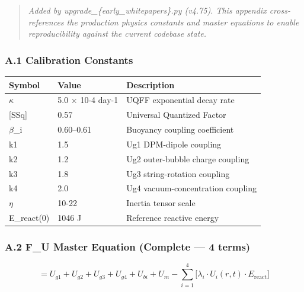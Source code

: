 \documentclass[
  11pt,
]{article}
\newcounter{none} %
\begin{document}
\begin{quote}
\emph{Added by upgrade\_\{early\_whitepapers\}.py (v4.75). This appendix
cross-references the production physics constants and master equations
to enable reproducibility against the current codebase state.}
\end{quote}

\subsubsection{A.1 Calibration
Constants}\label{a.1-calibration-constants}

{\def\LTcaptype{none} %
\begin{longtable}[]{@{}lll@{}}
\toprule\noalign{}
Symbol & Value & Description \\
\midrule\noalign{}
\endhead
\bottomrule\noalign{}
\endlastfoot
$\kappa$ & 5.0 $\times$ 10-4 day-1 & UQFF exponential decay rate \\
{[}SSq{]} & 0.57 & Universal Quantized Factor \\
$\beta$\_i & 0.60--0.61 & Buoyancy coupling coefficient \\
k1 & 1.5 & Ug1 DPM-dipole coupling \\
k2 & 1.2 & Ug2 outer-bubble charge coupling \\
k3 & 1.8 & Ug3 string-rotation coupling \\
k4 & 2.0 & Ug4 vacuum-concentration coupling \\
$\eta$ & 10-22 & Inertia tensor scale \\
E\_react(0) & 1046 J & Reference reactive energy \\
\end{longtable}
}

\subsubsection{A.2 F\_U Master Equation (Complete --- 4
terms)}\label{a.2-f_u-master-equation-complete-4-terms}

\[ = U_{g1} + U_{g2} + U_{g3} + U_{g4} + U_{bi} + U_m - \sum_{i=1}^{4}\bigl[\lambda_i \cdot U_i(r,t) \cdot E_{\mathrm{react}}\bigr]\]
\end{document}
